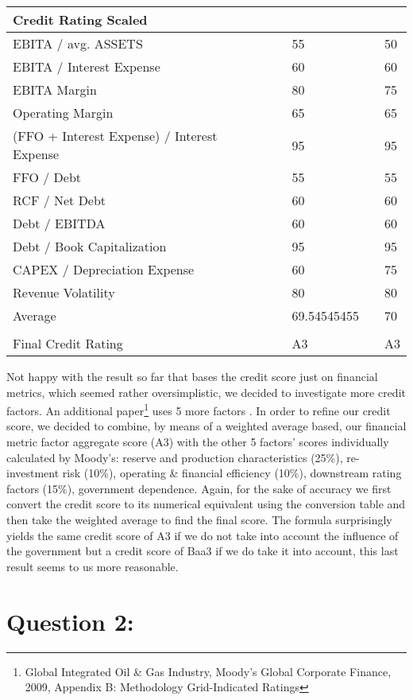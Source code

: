 \documentclass[
]{article}
\begin{document}
\begin{longtable}[]{@{}lllll@{}}
\toprule
Credit Rating Scaled & & & & \\
\midrule
\endhead
EBITA / avg. ASSETS & & 55 & & 50 \\
EBITA / Interest Expense & & 60 & & 60 \\
EBITA Margin & & 80 & & 75 \\
Operating Margin & & 65 & & 65 \\
(FFO + Interest Expense) / Interest Expense & & 95 & & 95 \\
FFO / Debt & & 55 & & 55 \\
RCF / Net Debt & & 60 & & 60 \\
Debt / EBITDA & & 60 & & 60 \\
Debt / Book Capitalization & & 95 & & 95 \\
CAPEX / Depreciation Expense & & 60 & & 75 \\
Revenue Volatility & & 80 & & 80 \\
Average & & 69.54545455 & & 70 \\
& & & & \\
Final Credit Rating & & A3 & & A3 \\
\bottomrule
\end{longtable}

Not happy with the result so far that bases the credit score just on
financial metrics, which seemed rather oversimplistic, we decided to
investigate more credit factors. An additional paper\footnote{Global
  Integrated Oil \& Gas Industry, Moody's Global Corporate Finance,
  2009, Appendix B: Methodology Grid-Indicated Ratings} uses 5 more
factors . In order to refine our credit score, we decided to combine, by
means of a weighted average based, our financial metric factor aggregate
score (A3) with the other 5 factors' scores individually calculated by
Moody's: reserve and production characteristics (25\%), re-investment
risk (10\%), operating \& financial efficiency (10\%), downstream rating
factors (15\%), government dependence. Again, for the sake of accuracy
we first convert the credit score to its numerical equivalent using the
conversion table and then take the weighted average to find the final
score. The formula surprisingly yields the same credit score of A3 if we
do not take into account the influence of the government but a credit
score of Baa3 if we do take it into account, this last result seems to
us more reasonable.

\hypertarget{question-2}{%
\section{Question 2:}\label{question-2}}
\end{document}
